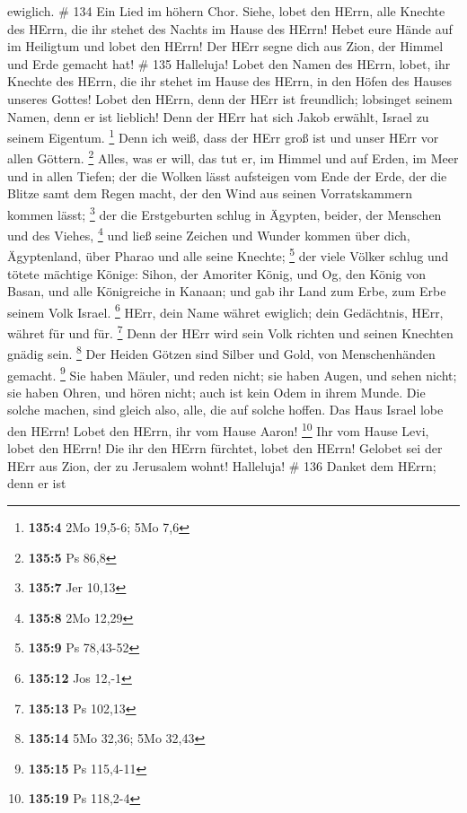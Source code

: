 ewiglich. \# 134  Ein Lied im höhern Chor. Siehe, lobet den
HErrn, alle Knechte des HErrn, die ihr stehet des Nachts im Hause des
HErrn!  Hebet eure Hände auf im Heiligtum und lobet den
HErrn!  Der HErr segne dich aus Zion, der Himmel und Erde
gemacht hat! \# 135  Halleluja! Lobet den Namen des HErrn,
lobet, ihr Knechte des HErrn,  die ihr stehet im Hause des
HErrn, in den Höfen des Hauses unseres Gottes!  Lobet den
HErrn, denn der HErr ist freundlich; lobsinget seinem Namen, denn er ist
lieblich!  Denn der HErr hat sich Jakob erwählt, Israel zu
seinem Eigentum. \footnote{\textbf{135:4} 2Mo 19,5-6; 5Mo 7,6}
 Denn ich weiß, dass der HErr groß ist und unser HErr vor
allen Göttern. \footnote{\textbf{135:5} Ps 86,8}  Alles, was
er will, das tut er, im Himmel und auf Erden, im Meer und in allen
Tiefen;  der die Wolken lässt aufsteigen vom Ende der Erde,
der die Blitze samt dem Regen macht, der den Wind aus seinen
Vorratskammern kommen lässt; \footnote{\textbf{135:7} Jer 10,13}
 der die Erstgeburten schlug in Ägypten, beider, der
Menschen und des Viehes, \footnote{\textbf{135:8} 2Mo 12,29}
 und ließ seine Zeichen und Wunder kommen über dich,
Ägyptenland, über Pharao und alle seine Knechte; \footnote{\textbf{135:9}
  Ps 78,43-52}  der viele Völker schlug und tötete mächtige
Könige:  Sihon, der Amoriter König, und Og, den König von
Basan, und alle Königreiche in Kanaan;  und gab ihr Land
zum Erbe, zum Erbe seinem Volk Israel. \footnote{\textbf{135:12} Jos
  12,-1}  HErr, dein Name währet ewiglich; dein Gedächtnis,
HErr, währet für und für. \footnote{\textbf{135:13} Ps 102,13}
 Denn der HErr wird sein Volk richten und seinen Knechten
gnädig sein. \footnote{\textbf{135:14} 5Mo 32,36; 5Mo 32,43}
 Der Heiden Götzen sind Silber und Gold, von Menschenhänden
gemacht. \footnote{\textbf{135:15} Ps 115,4-11}  Sie haben
Mäuler, und reden nicht; sie haben Augen, und sehen nicht; 
sie haben Ohren, und hören nicht; auch ist kein Odem in ihrem Munde.
 Die solche machen, sind gleich also, alle, die auf solche
hoffen.  Das Haus Israel lobe den HErrn! Lobet den HErrn,
ihr vom Hause Aaron! \footnote{\textbf{135:19} Ps 118,2-4} 
Ihr vom Hause Levi, lobet den HErrn! Die ihr den HErrn fürchtet, lobet
den HErrn!  Gelobet sei der HErr aus Zion, der zu Jerusalem
wohnt! Halleluja! \# 136  Danket dem HErrn; denn er ist
